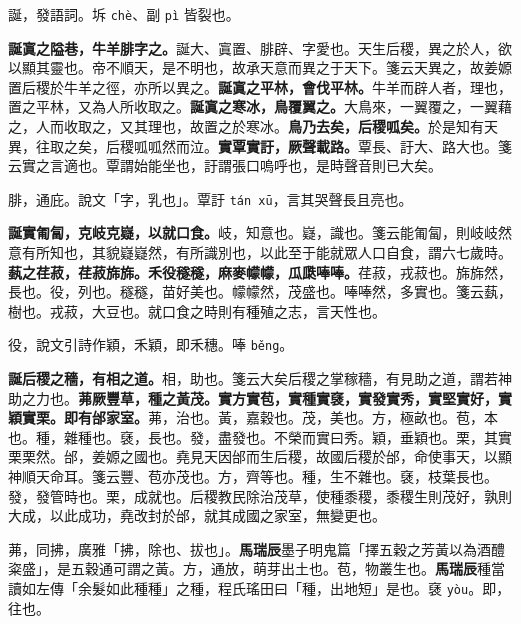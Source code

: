 \begin{quoting}誕，發語詞。坼 \texttt{chè}、副 \texttt{pì} 皆裂也。\end{quoting}

\textbf{誕寘之隘巷，牛羊腓字之。}{\footnotesize 誕大、寘置、腓辟、字愛也。天生后稷，異之於人，欲以顯其靈也。帝不順天，是不明也，故承天意而異之于天下。箋云天異之，故姜嫄置后稷於牛羊之徑，亦所以異之。}\textbf{誕寘之平林，會伐平林。}{\footnotesize 牛羊而辟人者，理也，置之平林，又為人所收取之。}\textbf{誕寘之寒冰，鳥覆翼之。}{\footnotesize 大鳥來，一翼覆之，一翼藉之，人而收取之，又其理也，故置之於寒冰。}\textbf{鳥乃去矣，后稷呱矣。}{\footnotesize 於是知有天異，往取之矣，后稷呱呱然而泣。}\textbf{實覃實訏，厥聲載路。}{\footnotesize 覃長、訏大、路大也。箋云實之言適也。覃謂始能坐也，訏謂張口嗚呼也，是時聲音則已大矣。}

\begin{quoting}腓，通庇。說文「字，乳也」。覃訏 \texttt{tán xū}，言其哭聲長且亮也。\end{quoting}

\textbf{誕實匍匐，克岐克嶷，以就口食。}{\footnotesize 岐，知意也。嶷，識也。箋云能匍匐，則岐岐然意有所知也，其貌嶷嶷然，有所識別也，以此至于能就眾人口自食，謂六七歲時。}\textbf{蓺之荏菽，荏菽旆旆。禾役穟穟，麻麥幪幪，瓜瓞唪唪。}{\footnotesize 荏菽，戎菽也。旆旆然，長也。役，列也。穟穟，苗好美也。幪幪然，茂盛也。唪唪然，多實也。箋云蓺，樹也。戎菽，大豆也。就口食之時則有種殖之志，言天性也。}

\begin{quoting}役，說文引詩作穎，禾穎，即禾穗。唪 \texttt{běng}。\end{quoting}

\textbf{誕后稷之穡，有相之道。}{\footnotesize 相，助也。箋云大矣后稷之掌稼穡，有見助之道，謂若神助之力也。}\textbf{茀厥豐草，種之黃茂。實方實苞，實種實褎，實發實秀，實堅實好，實穎實栗。即有邰家室。}{\footnotesize 茀，治也。黃，嘉穀也。茂，美也。方，極畝也。苞，本也。種，雜種也。褎，長也。發，盡發也。不榮而實曰秀。穎，垂穎也。栗，其實栗栗然。邰，姜嫄之國也。堯見天因邰而生后稷，故國后稷於邰，命使事天，以顯神順天命耳。箋云豐、苞亦茂也。方，齊等也。種，生不雜也。褎，枝葉長也。發，發管時也。栗，成就也。后稷教民除治茂草，使種黍稷，黍稷生則茂好，孰則大成，以此成功，堯改封於邰，就其成國之家室，無變更也。}

\begin{quoting}茀，同拂，廣雅「拂，除也、拔也」。\textbf{馬瑞辰}墨子明鬼篇「擇五穀之芳黃以為酒醴粢盛」，是五穀通可謂之黃。方，通放，萌芽出土也。苞，物叢生也。\textbf{馬瑞辰}種當讀如左傳「余髮如此種種」之種，程氏瑤田曰「種，出地短」是也。褎 \texttt{yòu}。即，往也。\end{quoting}

